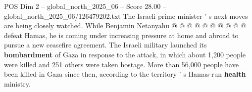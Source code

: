 \begin{textsample}{POS Dim 2 – global\_north\_2025\_06 – Score 28.00 – global\_north\_2025\_06/126479202.txt}
The Israeli prime minister ' s next moves are being closely watched.
While Benjamin Netanyahu @ @ @ @ @ @ @ @ @ @ defeat Hamas, he is coming under increasing pressure at home and abroad to pursue a new ceasefire agreement.
The Israeli military launched its \textbf{bombardment} of Gaza in response to the attack, in which about 1,200 people were killed and 251 others were taken hostage.
More than 56,000 people have been killed in Gaza since then, according to the territory ' s Hamas-run \textbf{health} ministry.

\end{textsample}
